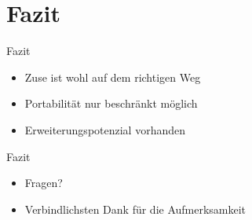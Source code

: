 \documentclass{beamer}
\begin{document}
\section{Fazit}

\begin{frame}{Fazit}
\begin{itemize}
\item Zuse ist wohl auf dem richtigen Weg
\item Portabilität nur beschränkt möglich
\item Erweiterungspotenzial vorhanden
\end{itemize}
\end{frame}

\begin{frame}{Fazit}
\begin{itemize}
\item Fragen?
\item Verbindlichsten Dank für die Aufmerksamkeit
\end{itemize}
\end{frame}
\end{document}
